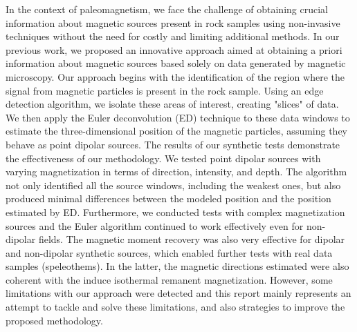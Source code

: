 \begin{adjustwidth}{18pt}{38pt}
{        In the context of paleomagnetism, we face the challenge of obtaining crucial information about magnetic sources present in rock samples using non-invasive techniques without the need for costly and limiting additional methods. In our previous work, we proposed an innovative approach aimed at obtaining a priori information about magnetic sources based solely on data generated by magnetic microscopy. Our approach begins with the identification of the region where the signal from magnetic particles is present in the rock sample. Using an edge detection algorithm, we isolate these areas of interest, creating "slices" of data. We then apply the Euler deconvolution (ED) technique to these data windows to estimate the three-dimensional position of the magnetic particles, assuming they behave as point dipolar sources. The results of our synthetic tests demonstrate the effectiveness of our methodology. We tested point dipolar sources with varying magnetization in terms of direction, intensity, and depth. The algorithm not only identified all the source windows, including the weakest ones, but also produced minimal differences between the modeled position and the position estimated by ED. Furthermore, we conducted tests with complex magnetization sources and the Euler algorithm continued to work effectively even for non-dipolar fields. The magnetic moment recovery was also very effective for dipolar and non-dipolar synthetic sources, which enabled further tests with real data samples (speleothems). In the latter, the magnetic directions estimated were also coherent with the induce isothermal remanent magnetization. However, some limitations with our approach were detected and this report mainly represents an attempt to tackle and solve these limitations, and also strategies to improve the proposed methodology.
            
            
        }
        \end{adjustwidth}


